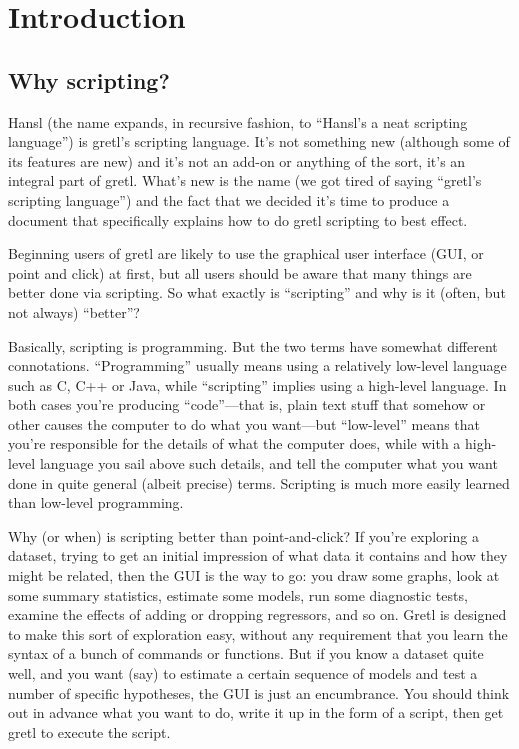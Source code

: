 \chapter{Introduction}
\label{intro}

\section{Why scripting?}

Hansl (the name expands, in recursive fashion, to ``Hansl's a neat
scripting language'') is gretl's scripting language. It's not something
new (although some of its features are new) and it's not an add-on or
anything of the sort, it's an integral part of gretl. What's new is
the name (we got tired of saying ``gretl's scripting language'') and
the fact that we decided it's time to produce a document that
specifically explains how to do gretl scripting to best effect.

Beginning users of gretl are likely to use the graphical user
interface (GUI, or point and click) at first, but all users should be
aware that many things are better done via scripting. So what exactly
is ``scripting'' and why is it (often, but not always) ``better''?

Basically, scripting is programming. But the two terms have somewhat
different connotations. ``Programming'' usually means using a
relatively low-level language such as C, C++ or Java, while
``scripting'' implies using a high-level language. In both cases
you're producing ``code''---that is, plain text stuff that somehow or
other causes the computer to do what you want---but ``low-level''
means that you're responsible for the details of what the computer
does, while with a high-level language you sail above such details,
and tell the computer what you want done in quite general (albeit
precise) terms. Scripting is much more easily learned than low-level
programming.

Why (or when) is scripting better than point-and-click? If you're
exploring a dataset, trying to get an initial impression of what data
it contains and how they might be related, then the GUI is the way to
go: you draw some graphs, look at some summary statistics, estimate
some models, run some diagnostic tests, examine the effects of adding
or dropping regressors, and so on. Gretl is designed to make this sort
of exploration easy, without any requirement that you learn the syntax
of a bunch of commands or functions. But if you know a dataset quite
well, and you want (say) to estimate a certain sequence of models and
test a number of specific hypotheses, the GUI is just an
encumbrance. You should think out in advance what you want to do,
write it up in the form of a script, then get gretl to execute the
script. 

